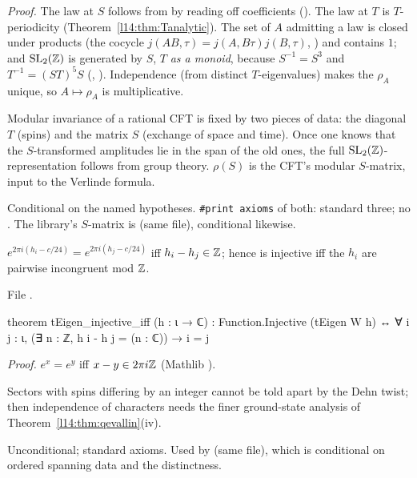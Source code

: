 \noindent\emph{Proof.} The law at $S$ follows from  by reading off coefficients ().
The law at $T$ is $T$-periodicity (Theorem~\ref{l14:thm:Tanalytic}). The set of $A$ admitting a law is closed under products
(the cocycle $j(AB,\tau) = j(A,B\tau)j(B,\tau)$, ) and contains $1$; and $\mathrm{SL}_2(\mathbb{Z})$ is generated by $S$, $T$
\emph{as a monoid}, because $S^{-1} = S^3$ and $T^{-1} = (ST)^5S$ (,
). Independence (from distinct $T$-eigenvalues) makes the $\rho_A$ unique, so $A\mapsto\rho_A$ is
multiplicative.
\begin{physics}
Modular invariance of a rational CFT is fixed by two pieces of data: the diagonal $T$ (spins) and the matrix $S$ (exchange of
space and time). Once one knows that the $S$-transformed amplitudes lie in the span of the old ones, the full
$\mathrm{SL}_2(\mathbb{Z})$-representation follows from group theory. $\rho(S)$ is the CFT's modular $S$-matrix, input to the Verlinde
formula.
\end{physics}
\begin{status}
Conditional on the named hypotheses. \texttt{\#print axioms} of both: standard three; no . The library's
$S$-matrix is  (same file), conditional likewise.
\end{status}

\begin{theorem}\label{l14:thm:teigen}
$e^{2\pi i(h_i-c/24)} = e^{2\pi i(h_j-c/24)}$ iff $h_i - h_j\in{\mathbb{Z}}$; hence  is injective iff the $h_i$ are pairwise
incongruent mod ${\mathbb{Z}}$.
\end{theorem}
\noindent File .
\begin{leancode}
theorem tEigen_injective_iff (h : ι → ℂ) :
    Function.Injective (tEigen W h) ↔ ∀ i j : ι, (∃ n : ℤ, h i - h j = (n : ℂ)) → i = j
\end{leancode}
\noindent\emph{Proof.} $e^x = e^y$ iff $x - y\in2\pi i{\mathbb{Z}}$ (Mathlib ).
\begin{physics}
Sectors with spins differing by an integer cannot be told apart by the Dehn twist; then independence of characters needs the
finer ground-state analysis of Theorem~\ref{l14:thm:qevallin}(iv).
\end{physics}
\begin{status}
Unconditional; standard axioms. Used by  (same file), which is conditional
on ordered spanning data and the distinctness.
\end{status}

